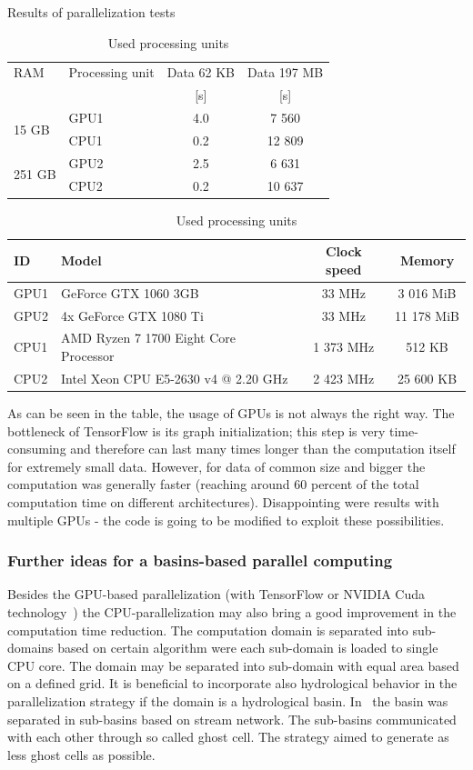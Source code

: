 \begin{table}[h]
  \centering
  \caption{Results of parallelization tests}
  \makegapedcells
  \begin{tabular}{|l|p{2.2cm}|c|c|}\hline
    RAM & Processing unit & Data 62 KB & Data 197 MB\\
     & & [s] & [s]\\\hline
    \multirow{2}{*}{15 GB} & GPU1 & 4.0 & 7 560\\
    & CPU1 & 0.2 & 12 809\\\hline
    \multirow{2}{*}{251 GB} & GPU2 & 2.5 & 6 631\\
    & CPU2 & 0.2 & 10 637\\\hline
  \end{tabular}
  \label{tab:GPU_results}
  \caption{Used processing units}
  \begin{tabular}{|l|p{1.9cm}|c|c|}\hline
    ID & Model & Clock speed & Memory\\\hline
    GPU1 & GeForce GTX 1060 3GB & 33 MHz & 3 016 MiB \\\hline
    GPU2 & 4x GeForce GTX 1080 Ti & 33 MHz & 11 178 MiB \\\hline
    CPU1 & AMD Ryzen 7 1700 Eight Core Processor & 1 373 MHz & 512 KB \\\hline
    CPU2 & Intel Xeon CPU E5-2630 v4 @ 2.20 GHz & 2 423 MHz & 25 600 KB \\\hline
  \end{tabular}
\end{table}

As can be seen in the table, the usage of GPUs is not always the right way.
The bottleneck of TensorFlow is its graph initialization; this step is very
time-consuming and therefore can last many times longer than the computation
itself for extremely small data. However, for data of common size and bigger
the computation was generally faster (reaching around 60 percent of the total
computation time on different architectures). Disappointing were results with
multiple GPUs - the code is going to be modified to exploit these
possibilities.

\subsubsection{Further ideas for a basins-based parallel computing}
Besides the GPU-based parallelization (with TensorFlow \cite{tensorflow2015-whitepaper} or
NVIDIA Cuda technology~\cite{Kalyanapu2011,Le2015}) the
CPU-parallelization may also bring a good improvement in the computation
time reduction. The computation domain is separated into sub-domains
based on certain algorithm were each sub-domain is loaded to single
CPU core. The domain may be separated into sub-domain with equal area
based on a defined grid. It is beneficial to incorporate also
hydrological behavior in the parallelization
strategy if the domain is a hydrological basin. 
In~\cite{Vivoni2011} the basin was separated in sub-basins
based on stream network. The sub-basins communicated with each other through so called
ghost cell. The strategy aimed to generate as less ghost cells as
possible.

